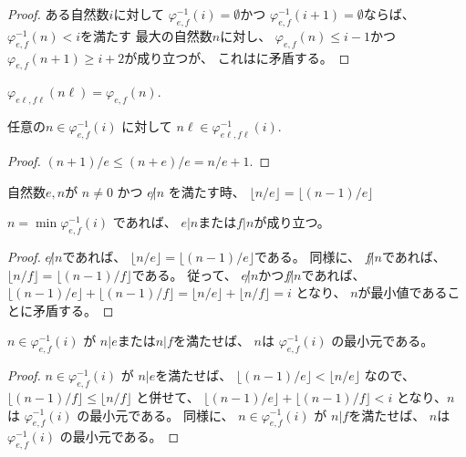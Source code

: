 \begin{proof}
ある自然数$i$に対して
$\varphi_{e,f}^{-1}(i) = \emptyset$かつ
$\varphi_{e,f}^{-1}(i+1) = \emptyset$ならば、
$\varphi_{e,f}^{-1}(n) < i$を満たす
最大の自然数$n$に対し、
$\varphi_{e,f}(n) \le i-1$かつ
$\varphi_{e,f}(n+1) \ge i+2$が成り立つが、
これはに矛盾する。
\end{proof}

\begin{lemma}
\label{lm:φ_mul}
\leanok
$\varphi_{e \ell, f \ell}(n \ell) = \varphi_{e,f}(n)$.
\end{lemma}

\begin{lemma}
任意の$n \in \varphi_{e,f}^{-1}(i)$
に対して
$n \ell \in \varphi_{e \ell,f \ell}^{-1}(i)$.
\end{lemma}

\begin{proof}
$
(n+1)/e \le (n+e)/e = n/e+1
$.
\end{proof}

\begin{lemma}
\label{lm:not_dvd_mod_eq}
\leanok
自然数$e,n$が
$n \ne 0$
かつ
$e \not | n$
を満たす時、
$\lfloor n / e \rfloor = \lfloor (n-1) / e \rfloor$
\end{lemma}

\begin{lemma}
$n = \min \varphi_{e,f}^{-1}(i)$
であれば、
$e | n$または$f | n$が成り立つ。
\end{lemma}

\begin{proof}
$e \not | n$であれば、
$\lfloor n / e \rfloor = \lfloor (n-1) / e \rfloor$である。
同様に、
$f \not | n$であれば、
$\lfloor n / f \rfloor = \lfloor (n-1) / f \rfloor$である。
従って、
$e \not | n$かつ$f \not | n$であれば、
$
\lfloor (n-1) / e \rfloor + \lfloor (n-1) / f \rfloor
= \lfloor n / e \rfloor + \lfloor n / f \rfloor
= i
$
となり、
$n$が最小値であることに矛盾する。
\end{proof}

\begin{lemma}
$n \in \varphi_{e,f}^{-1}(i)$
が
$n | e$または$n | f$を満たせば、
$n$は
$\varphi_{e,f}^{-1}(i)$
の最小元である。
\end{lemma}

\begin{proof}
$n \in \varphi_{e,f}^{-1}(i)$
が
$n | e$を満たせば、
$
\lfloor (n-1) / e \rfloor < \lfloor n / e \rfloor
$
なので、
$
\lfloor (n-1) / f \rfloor \le \lfloor n / f \rfloor
$
と併せて、
$\lfloor (n-1) / e \rfloor + \lfloor (n-1) / f \rfloor < i$
となり、$n$は
$\varphi_{e,f}^{-1}(i)$
の最小元である。
同様に、
$n \in \varphi_{e,f}^{-1}(i)$
が
$n | f$を満たせば、
$n$は
$\varphi_{e,f}^{-1}(i)$
の最小元である。
\end{proof}

